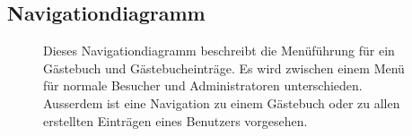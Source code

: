 \documentclass[10pt,a4paper]{scrartcl}
\begin{document}
\subsection{Navigationdiagramm}
\begin{figure}[!htbp]
 \caption{Dieses Navigationdiagramm beschreibt die Menüführung für ein Gästebuch und Gästebucheinträge. Es wird zwischen einem Menü für normale Besucher und Administratoren unterschieden. Ausserdem ist eine Navigation zu einem Gästebuch oder zu allen erstellten Einträgen eines Benutzers vorgesehen.}
\end{figure}
\newpage
\end{document}
